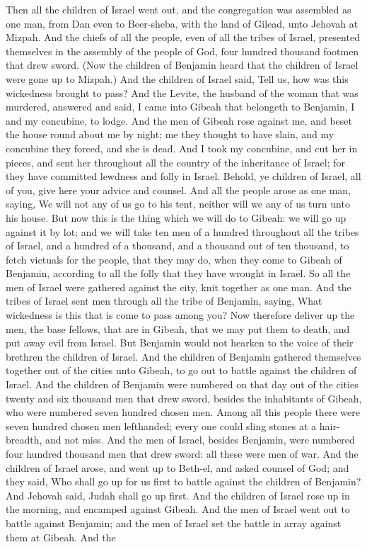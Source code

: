 Then all the children of Israel went out, and the congregation was assembled as one man, from Dan even to Beer-sheba, with the land of Gilead, unto Jehovah at Mizpah. And the chiefs of all the people, even of all the tribes of Israel, presented themselves in the assembly of the people of God, four hundred thousand footmen that drew sword. (Now the children of Benjamin heard that the children of Israel were gone up to Mizpah.) And the children of Israel said, Tell us, how was this wickedness brought to pass? And the Levite, the husband of the woman that was murdered, answered and said, I came into Gibeah that belongeth to Benjamin, I and my concubine, to lodge. And the men of Gibeah rose against me, and beset the house round about me by night; me they thought to have slain, and my concubine they forced, and she is dead. And I took my concubine, and cut her in pieces, and sent her throughout all the country of the inheritance of Israel; for they have committed lewdness and folly in Israel. Behold, ye children of Israel, all of you, give here your advice and counsel.  And all the people arose as one man, saying, We will not any of us go to his tent, neither will we any of us turn unto his house. But now this is the thing which we will do to Gibeah: we will go up against it by lot; and we will take ten men of a hundred throughout all the tribes of Israel, and a hundred of a thousand, and a thousand out of ten thousand, to fetch victuals for the people, that they may do, when they come to Gibeah of Benjamin, according to all the folly that they have wrought in Israel. So all the men of Israel were gathered against the city, knit together as one man.  And the tribes of Israel sent men through all the tribe of Benjamin, saying, What wickedness is this that is come to pass among you? Now therefore deliver up the men, the base fellows, that are in Gibeah, that we may put them to death, and put away evil from Israel. But Benjamin would not hearken to the voice of their brethren the children of Israel. And the children of Benjamin gathered themselves together out of the cities unto Gibeah, to go out to battle against the children of Israel. And the children of Benjamin were numbered on that day out of the cities twenty and six thousand men that drew sword, besides the inhabitants of Gibeah, who were numbered seven hundred chosen men. Among all this people there were seven hundred chosen men lefthanded; every one could sling stones at a hair-breadth, and not miss.  And the men of Israel, besides Benjamin, were numbered four hundred thousand men that drew sword: all these were men of war. And the children of Israel arose, and went up to Beth-el, and asked counsel of God; and they said, Who shall go up for us first to battle against the children of Benjamin? And Jehovah said, Judah shall go up first.  And the children of Israel rose up in the morning, and encamped against Gibeah. And the men of Israel went out to battle against Benjamin; and the men of Israel set the battle in array against them at Gibeah. And the 